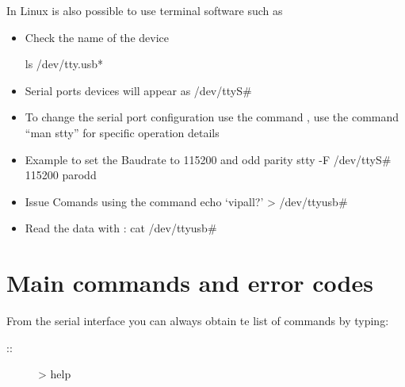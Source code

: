 \documentclass[letterpaper,10pt,english]{sphinxmanual}
\let\sphinxpxdimen\pdfpxdimen\else\newdimen\sphinxpxdimen
\begin{document}
\noindent\sphinxincludegraphics[width=350\sphinxpxdimen]{{CoolTerm2}.png}


In Linux is also possible to use terminal software such as 
\begin{itemize}
\item {} 
Check the name of the device

ls /dev/tty.usb*

\item {} 
Serial ports devices will appear as /dev/ttyS\#

\item {} 
To change the serial port configuration use the command , use the command
“man stty”
for specific operation details

\item {} 
Example to set the Baudrate to 115200 and odd parity
stty -F /dev/ttyS\# 115200 parodd

\item {} 
Issue Comands using the  command
echo ‘vipall?’ \textgreater{} /dev/ttyusb\#

\item {} 
Read the data with :
cat /dev/ttyusb\#

\end{itemize}


\section{Main commands and error codes}
\label{\detokenize{guide/getting_started:main-commands-and-error-codes}}
From the serial interface you can always obtain te list of commands by typing:
\begin{description}
\item[{::}] \leavevmode
\textgreater{} help

\end{description}
\end{document}
